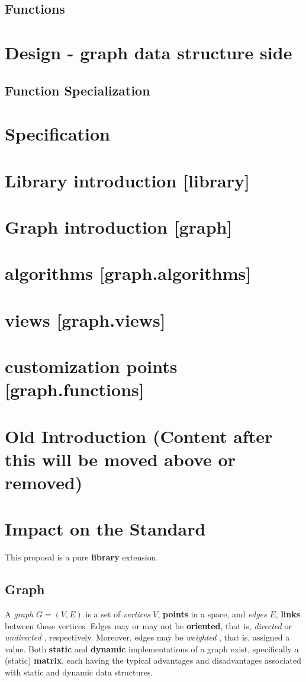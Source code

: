 \documentclass[10pt,onecolumn]{article}
\begin{document}
\subsection{Functions}
\section{Design - graph data structure side}
\subsection{Function Specialization}
\section{Specification}
\section{Library introduction [library]}
\section{Graph introduction [graph]}
\section{algorithms [graph.algorithms]}
\section{views [graph.views]}
\section{customization points [graph.functions]}


\section{Old Introduction (Content after this will be moved above or removed)}
\section{Impact on the Standard}
This proposal is a pure \textbf{library} extension.

\subsection{Graph}
 A \textit{graph} \cite{REF_graph} $G = (V, E)$ is a set of \textit{vertices} \cite{REF_graph} $V$, \textbf{points} in a space, and \textit{edges} \cite{REF_graph} $E$, \textbf{links} between these vertices. Edges may or may not be \textbf{oriented}, that is, \textit{directed} \cite{REF_graph} or \textit{undirected} \cite{REF_graph}, respectively. Moreover, edges may be \textit{weighted} \cite{REF_graph}, that is, assigned a value. Both \textbf{static} and \textbf{dynamic} implementations of a graph exist, specifically a (static) \textbf{matrix}, each having the typical advantages and disadvantages associated with static and dynamic data structures.
\end{document}
